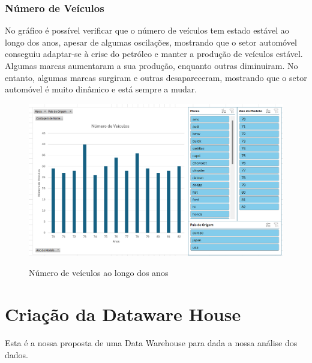 \documentclass[a4paper]{article}
\begin{document}
\subsubsection{Número de Veículos}
No gráfico é possível verificar que o número de veículos tem estado estável ao longo dos anos, apesar de 
algumas oscilações, mostrando que o setor automóvel conseguiu adaptar-se à crise do petróleo e manter a produção
de veículos estável. Algumas marcas aumentaram a sua produção, enquanto outras diminuiram.
No entanto, algumas marcas surgiram e outras desapareceram, mostrando que o setor automóvel é muito dinâmico e
está sempre a mudar.

\begin{figure}[h!]
    \centering
    \includegraphics[width=1\textwidth]{Recursos/NVeiculosGrafico.png} %
    \vspace{0.5cm}
    \label{fig:nveig}
    \caption{Número de veículos ao longo dos anos}
\end{figure}
\newpage
\section{Criação da Dataware House}\label{dwh}
Esta é a nossa proposta de uma Data Warehouse para dada a nossa análise dos dados.
\end{document}
